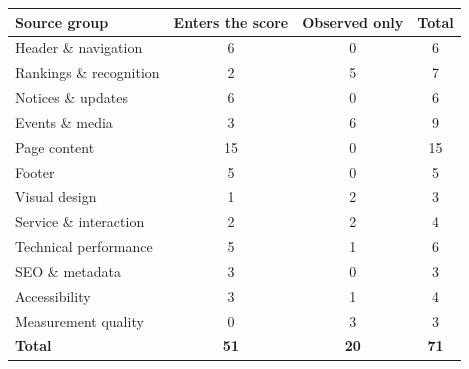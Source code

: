 \begin{tabular}{lccc}
\toprule
\textbf{Source group} & \textbf{Enters the score} & \textbf{Observed only} & \textbf{Total} \\
\midrule
Header \& navigation & 6 & 0 & 6 \\
Rankings \& recognition & 2 & 5 & 7 \\
Notices \& updates & 6 & 0 & 6 \\
Events \& media & 3 & 6 & 9 \\
Page content & 15 & 0 & 15 \\
Footer & 5 & 0 & 5 \\
Visual design & 1 & 2 & 3 \\
Service \& interaction & 2 & 2 & 4 \\
Technical performance & 5 & 1 & 6 \\
SEO \& metadata & 3 & 0 & 3 \\
Accessibility & 3 & 1 & 4 \\
Measurement quality & 0 & 3 & 3 \\
\midrule
\textbf{Total} & \textbf{51} & \textbf{20} & \textbf{71} \\
\bottomrule
\end{tabular}
